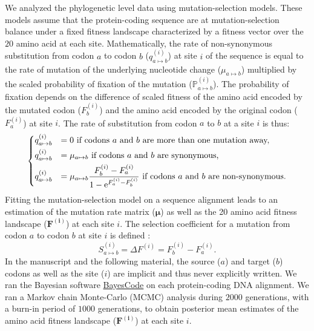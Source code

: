 \documentclass{article}
\newcommand{\UniDimArray}[1]{\bm{#1}}
\newcommand{\e}{\textrm{e}}
\newcommand{\proba}{\mathbb{P}}
\begin{document}
    We analyzed the phylogenetic level data using mutation-selection models. These models assume that the protein-coding sequence are at mutation-selection balance under a fixed fitness landscape characterized by a fitness vector over the $20$ amino acid at each site\cite{yang_mutationselection_2008, halpern_evolutionary_1998, rodrigue_mechanistic_2010}.
    Mathematically, the rate of non-synonymous substitution from codon $a$ to codon $b$ ($q_{a \mapsto b}^{(i)}$) at site $i$ of the sequence is equal to the rate of mutation of the underlying nucleotide change ($\mu_{a \mapsto b}$) multiplied by the scaled probability of fixation of the mutation ($\proba_{a \mapsto b}^{(i)}$).
    The probability of fixation depends on the difference of scaled fitness of the amino acid encoded by the mutated codon ($F_b^{(i)}$) and the amino acid encoded by the original codon ($F_a^{(i)}$) at site $i$\cite{wright_evolution_1931, fisher_genetical_1930}.
    The rate of substitution from codon $a$ to $b$ at a site $i$ is thus:
    \begin{equation}
        \begin{dcases}
            q_{a \mapsto b}^{(i)} & = 0 \text{ if codons $a$ and $b$ are more than one mutation away,} \\
            q_{a \mapsto b}^{(i)} & = \mu_{a \mapsto b} \text{ if codons $a$ and $b$ are synonymous,} \\
            q_{a \mapsto b}^{(i)} & = \mu_{a \mapsto b} \dfrac{F_b^{(i)} - F_a^{(i)}}{1 - \e^{F_a^{(i)} - F_b^{(i)}}} \text{ if codons $a$ and $b$ are non-synonymous}.
        \end{dcases}
    \end{equation}
    Fitting the mutation-selection model on a sequence alignment leads to an estimation of the mutation rate matrix ($\UniDimArray{\mu}$) as well as the 20 amino acid fitness landscape ($\UniDimArray{F^{(i)}}$) at each site $i$.
    The selection coefficient for a mutation from codon $a$ to codon $b$ at site $i$ is defined :
    \begin{equation}
        S_{a \mapsto b}^{(i)} = \Delta F^{(i)} = F^{(i)}_{b} - F^{(i)}_{a}.
    \end{equation}
    In the manuscript and the following material, the source ($a$) and target ($b$) codons as well as the site ($i$) are implicit and thus never explicitly written.
    We ran the Bayesian software \href{https://github.com/bayesiancook/bayescode}{BayesCode} on each protein-coding DNA alignment\cite{lartillot_phylobayes_2013, rodrigue_detecting_2017, rodrigue_bayesian_2021}.
    We ran a Markov chain Monte-Carlo (MCMC) analysis during $2000$ generations, with a burn-in period of $1000$ generations, to obtain posterior mean estimates of the amino acid fitness landscape ($\UniDimArray{F^{(i)}}$) at each site $i$\@.
\end{document}
